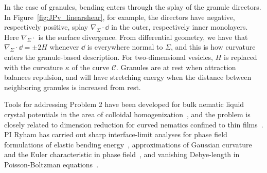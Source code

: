 In the case of granules, bending enters through the splay of the granule
directors. In Figure~\ref{fig:JPv_linearshear}, for example, the
directors have negative, respectively positive, splay $\nabla_{\Sigma}
\cdot \dd$ in the outer, respectively inner monolayers. Here
$\nabla_{\Sigma}\cdot{}$ is the surface divergence. From differential
geometry, we have that $\nabla_{\Sigma} \cdot \dd = \pm 2H$ whenever $\dd$ is
everywhere normal to $\Sigma$, and this is how curvature enters the
granule-based description. For two-dimensional vesicles, $H$ is replaced
with the curvature $\kappa$ of the curve $\mathcal{C}$. Granules are at
rest when attraction balances repulsion, and will have stretching energy
when the distance between neighboring granules is increased from rest.

Tools for addressing Problem 2 have been developed for bulk nematic
liquid crystal potentials in the area of colloidal
homogenization~\cite{Canevari2019DesignOE, doi:10.1137/18M1163919,
BERLYAND200597, doi:10.1137/130910348}, and the problem is closely
related to dimension reduction for curved nematics confined to thin
films~\cite{Golovaty2017DimensionRF, Golovaty2015DimensionRF,
doi:10.1142/S0218202516500470, FoFrLe07}. PI Ryham has carried out sharp
interface-limit analyses for phase field formulations of elastic bending
energy~\cite{0951-7715-18-3-016, Du05}, approximations of Gaussian
curvature and the Euler characteristic in phase field~\cite{DuEuler},
and vanishing Debye-length in Poisson-Boltzman equations~\cite{Lee2018,
1531-3492_2006_2_357}.

